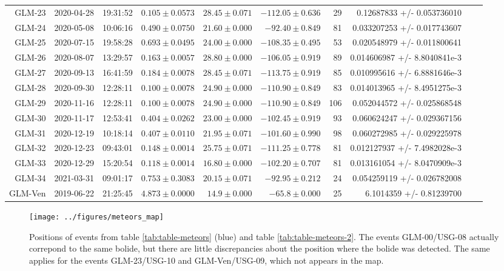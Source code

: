 \begin{table*}
\begin{tabular}{rrrrrrrrrr}
GLM-23 & 2020-04-28 & 19:31:52 & $0.105\pm 0.0573$ & $28.45 \pm 0.071$ & $-112.05 \pm  0.636$ & 29           & 0.12687833 +/- 0.053736010    \\
GLM-24 & 2020-05-08 & 10:06:16 & $0.490\pm 0.0750$ & $21.60 \pm 0.000$ & $-92.40 \pm   0.849$ & 81           & 0.033207253 +/- 0.017743607   \\
GLM-25 & 2020-07-15 & 19:58:28 & $0.693\pm 0.0495$ & $24.00 \pm 0.000$ & $-108.35 \pm  0.495$ & 53           & 0.020548979 +/- 0.011800641   \\
GLM-26 & 2020-08-07 & 13:29:57 & $0.163\pm 0.0057$ & $28.80 \pm 0.000$ & $-106.05 \pm  0.919$ & 89           & 0.014606987 +/- 8.8040841e-3  \\
GLM-27 & 2020-09-13 & 16:41:59 & $0.184\pm 0.0078$ & $28.45 \pm 0.071$ & $-113.75 \pm  0.919$ & 85           & 0.010995616 +/- 6.8881646e-3  \\
GLM-28 & 2020-09-30 & 12:28:11 & $0.100\pm 0.0078$ & $24.90 \pm 0.000$ & $-110.90 \pm  0.849$ & 83           & 0.014013965 +/- 8.4951275e-3  \\
GLM-29 & 2020-11-16 & 12:28:11 & $0.100\pm 0.0078$ & $24.90 \pm 0.000$ & $-110.90 \pm  0.849$ &106           & 0.052044572 +/- 0.025868548   \\
GLM-30 & 2020-11-17 & 12:53:41 & $0.404\pm 0.0262$ & $23.00 \pm 0.000$ & $-102.45 \pm  0.919$ & 93           & 0.060624247 +/- 0.029367156   \\
GLM-31 & 2020-12-19 & 10:18:14 & $0.407\pm 0.0110$ & $21.95 \pm 0.071$ & $-101.60 \pm  0.990$ & 98           & 0.060272985 +/- 0.029225978   \\
GLM-32 & 2020-12-23 & 09:43:01 & $0.148\pm 0.0014$ & $25.75 \pm 0.071$ & $-111.25 \pm  0.778$ & 81           & 0.012127937 +/- 7.4982028e-3  \\
GLM-33 & 2020-12-29 & 15:20:54 & $0.118\pm 0.0014$ & $16.80 \pm 0.000$ & $-102.20 \pm  0.707$ & 81           & 0.013161054 +/- 8.0470909e-3  \\
GLM-34 & 2021-03-31 & 09:01:17 & $0.753\pm 0.3083$ & $20.15 \pm 0.071$ & $-92.95 \pm  0.212$  & 24           & 0.054259119 +/- 0.026782008   \\
GLM-Ven& 2019-06-22 & 21:25:45 & $4.873\pm 0.0000$ & $14.9 \pm 0.000$  & $-65.8 \pm 0.000$    & 25           & 6.1014359 +/- 0.81239700      \\ \hline
\end{tabular}
\end{table*}

\begin{figure}
  \centering
  \texttt{[image: ../figures/meteors\_map]}
  \caption{Positions of events from table \ref{tab:table-meteors} (blue) and table \ref{tab:table-meteors-2}. The events GLM-00/USG-08 actually correpond to the same bolide, but there are little discrepancies about the position where the bolide was detected. The same applies for the events GLM-23/USG-10 and GLM-Ven/USG-09, which not appears in the map.}
  \label{fig:meteors-map}
\end{figure}

